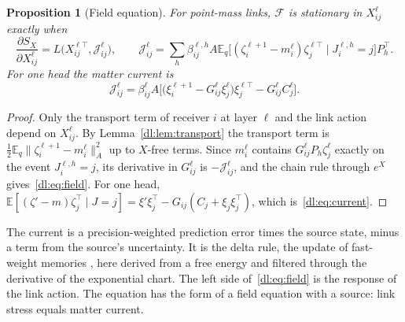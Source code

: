 \documentclass[11pt]{article}
\newtheorem{proposition}[theorem]{Proposition}
\theoremstyle{definition}
\theoremstyle{remark}
\newcommand{\E}{\mathbb E}
\newcommand{\curr}{\mathcal J}
\begin{document}
\begin{proposition}[Field equation]
\label{dl:prop:field}
For point-mass links, $\mathcal F$ is stationary in $X_{ij}^\ell$ exactly when
\begin{equation}
\frac{\partial S_X}{\partial X_{ij}^\ell}=L\big(X_{ij}^{\ell\top},\curr_{ij}^\ell\big),\qquad
\curr_{ij}^\ell=\sum_h\beta_{ij}^{\ell,h}A\E_q\big[(\zeta_i^{\ell+1}-m_i^\ell)\zeta_j^{\ell\top}\mid J_i^{\ell,h}=j\big]P_h^\top.
\label{dl:eq:field}
\end{equation}
For one head the matter current is
\begin{equation}
\curr_{ij}^\ell=\beta_{ij}^\ell A\Big[\big(\xi_i^{\ell+1}-G_{ij}^\ell\xi_j^\ell\big)\xi_j^{\ell\top}-G_{ij}^\ell C_j^\ell\Big].
\label{dl:eq:current}
\end{equation}
\end{proposition}

\begin{proof}
Only the transport term of receiver $i$ at layer $\ell$ and the link action depend on $X_{ij}^\ell$. By Lemma~\ref{dl:lem:transport} the transport term is $\tfrac12\E_q\|\zeta_i^{\ell+1}-m_i^\ell\|_A^2$ up to $X$-free terms. Since $m_i^\ell$ contains $G_{ij}^\ell P_h\zeta_j^\ell$ exactly on the event $J_i^{\ell,h}=j$, its derivative in $G_{ij}^\ell$ is $-\curr_{ij}^\ell$, and the chain rule through $e^X$ gives~\eqref{dl:eq:field}. For one head, $\E[(\zeta'-m)\zeta_j^\top\mid J=j]=\xi'\xi_j^\top-G_{ij}(C_j+\xi_j\xi_j^\top)$, which is~\eqref{dl:eq:current}.
\end{proof}

The current is a precision-weighted prediction error times the source state, minus a term from the source's uncertainty. It is the delta rule, the update of fast-weight memories \cite{dl:schmidhuber1992}, here derived from a free energy and filtered through the derivative of the exponential chart. The left side of~\eqref{dl:eq:field} is the response of the link action. The equation has the form of a field equation with a source: link stress equals matter current.
\end{document}
